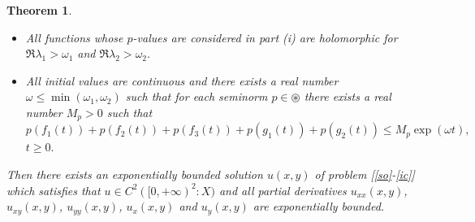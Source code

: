 \documentclass{amsart}
\newtheorem{thm}{Theorem}[section]
\theoremstyle{definition}
\theoremstyle{remark}
\numberwithin{equation}{section}
\begin{document}
\begin{thm}
\begin{itemize}
\begin{align}\notag 
p\Bigl( \lambda_{2}G& \bigl(\lambda_{1},\lambda_{2}\bigr)-\bigl({\mathcal L}f_{1} \bigr)\bigl( \lambda_{1} \bigr)  \Bigr)
\\\label{ok5}&  \leq M_{p}  \bigl| \lambda_{1}\bigr|^{-1-\epsilon_{1}} \cdot \bigl| \lambda_{2}\bigr|^{-1-\epsilon_{2}} , \quad \Re \lambda_{1} >\omega_{1},\ \Re \lambda_{2}>\omega_{2},
\end{align}
\begin{align}
p\Biggl( E\Bigl[\lambda_{2}G&\bigl(\lambda_{1},\lambda_{2}\bigr)-\bigl({\mathcal L}f_{1} \bigr)\bigl( \lambda_{1} \bigr)  \Bigr]\Biggr) \\\label{ok51} & \leq M_{p}  \bigl| \lambda_{1}\bigr|^{-1-\epsilon_{1}} \cdot \bigl| \lambda_{2}\bigr|^{-1-\epsilon_{2}} , \quad \Re \lambda_{1} >\omega_{1},\ \Re \lambda_{2}>\omega_{2} 
\end{align}
and
\begin{align}\label{ok6}
p\Bigl( FG\bigl(\lambda_{1},\lambda_{2}\bigr)\Bigr) \leq M_{p}  \bigl| \lambda_{1}\bigr|^{-1-\epsilon_{1}} \cdot \bigl| \lambda_{2}\bigr|^{-1-\epsilon_{2}} , \quad \Re \lambda_{1} >\omega_{1},\ \Re \lambda_{2}>\omega_{2}.
\end{align}
\item[(ii)] All functions whose $p$-values are considered in part \emph{(i)} are holomorphic for $\Re \lambda_{1}>\omega_{1}$ and $\Re \lambda_{2}>\omega_{2}.$
\item[(iii)] All initial values are continuous and there exists a real number $\omega \leq \min(\omega_{1},\omega_{2})$ such that for each seminorm $p\in \circledast$ there exists a real number $M_{p}>0$ such that $ p(f_{1}(t))+ p( f_{2}(t))+p(f_{3}(t))+ p(g_{1}(t))+p(g_{2}(t))\leq M_{p}\exp(\omega t),$ $t\geq 0.$
\end{itemize}
Then there exists an exponentially bounded solution $u(x,y)$ of problem \emph{[\eqref{so}-\eqref{ic}]} which satisfies that $u\in C^{2}([0,+\infty)^{2} :  X)$ and all partial derivatives $u_{xx}(x,y)$, $u_{xy}(x,y)$, $u_{yy}(x,y)$, $u_{x}(x,y)$ and $u_{y}(x,y)$ are exponentially bounded.
\end{thm}
\end{document}
